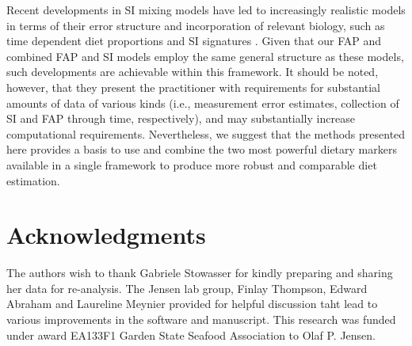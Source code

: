 \documentclass[fleqn,10pt]{wlpeerj}
\begin{document}
Recent developments in SI mixing models have led to increasingly
realistic models in terms of their error structure \citep{hopkins_estimating_2012} and
incorporation of relevant biology, such as time dependent diet
proportions and SI signatures \citep{parnell_bayesian_2012}. Given that our FAP and combined
FAP and SI models employ the same general structure as these models,
such developments are achievable within this framework. It should be
noted, however, that they present the practitioner with requirements for substantial
amounts of data of various kinds (i.e., measurement error estimates,
collection of SI and FAP through time, respectively), and may
substantially increase computational requirements. Nevertheless, we
suggest that the methods presented here provides a basis to use and
combine the two most powerful dietary markers available in
a single framework to produce more robust and comparable diet estimation.


\section*{Acknowledgments}

The authors wish to thank Gabriele Stowasser for kindly preparing and sharing her data for re-analysis. The Jensen lab group, Finlay Thompson, Edward Abraham and Laureline Meynier provided for helpful discussion taht lead to various improvements in the software and manuscript. This research was funded under award EA133F1 Garden State Seafood Association to Olaf P. Jensen.


\end{document}
